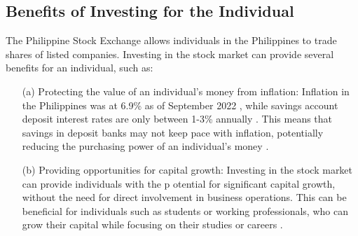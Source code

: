 \subsection{Benefits of Investing for the Individual}
The Philippine Stock Exchange allows individuals in the Philippines
 to trade shares of listed companies. Investing in the stock market can provide 
 several benefits for an individual, such as:
\begin{itemize}
    \item[(a)] Protecting the value of an individual's money from inflation: Inflation 
    in the Philippines was at 6.9\% as of September 2022 
    \cite{tradingEconomics}, 
    while savings account deposit interest rates are only between 1-3\% annually 
    \cite{BSP19}. 
    This means that savings in deposit banks may not keep pace with inflation, 
    potentially reducing the purchasing power of an individual's money 
    \cite{RBC, EdwardJones}.
    \item[(b)] Providing opportunities for capital growth: 
    Investing in the stock market can provide individuals with the p
    otential for significant capital growth, without the need for direct 
    involvement in business operations. This can be beneficial for individuals
    such as students or working professionals, who can grow their capital while 
    focusing on their studies or careers
    \cite{USSecAndExComm}.
\end{itemize}